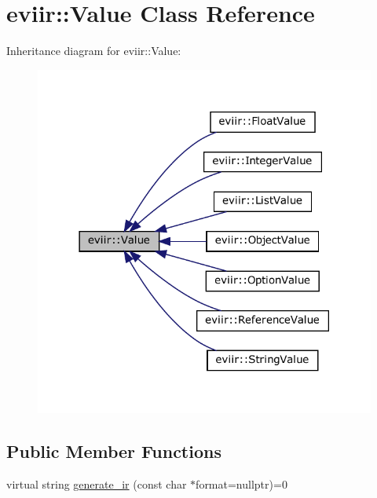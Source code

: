 \hypertarget{classeviir_1_1Value}{}\section{eviir\+:\+:Value Class Reference}
\label{classeviir_1_1Value}


Inheritance diagram for eviir\+:\+:Value\+:\nopagebreak
\begin{figure}[H]
\begin{center}
\leavevmode
\includegraphics[width=318pt]{classeviir_1_1Value__inherit__graph}
\end{center}
\end{figure}
\subsection*{Public Member Functions}
\begin{DoxyCompactItemize}
\item 
virtual string \hyperlink{classeviir_1_1Value_a0613bf660425df31e230681555f64dea}{generate\+\_\+ir} (const char $\ast$format=nullptr)=0
\end{DoxyCompactItemize}
